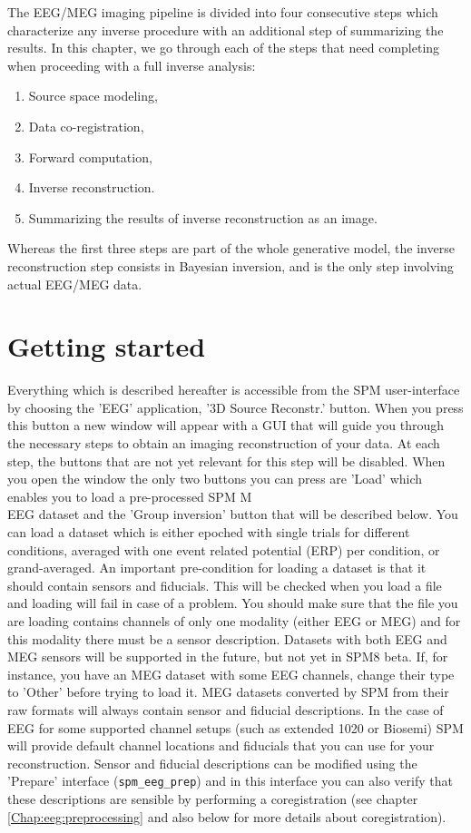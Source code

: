 The EEG/MEG imaging pipeline is divided into four consecutive steps which characterize
any inverse procedure with an additional step of summarizing the results. In this chapter, we go through each of the steps that need
completing when proceeding with a full inverse analysis:

\begin{enumerate}
    \item Source space modeling,
    \item Data co-registration,
    \item Forward computation,
    \item Inverse reconstruction.
    \item Summarizing the results of inverse reconstruction as an image.
\end{enumerate}

Whereas the first three steps are part of the whole generative model, the inverse reconstruction
step consists in Bayesian inversion, and is the only step involving actual EEG/MEG data.\\

\section{Getting started}

Everything which is described hereafter is accessible from the SPM user-interface by choosing
the 'EEG' application, '3D Source Reconstr.' button. When you press this button a new window
will appear with a GUI that will guide you through the necessary steps to obtain an imaging
reconstruction of your data. At each step, the buttons that are not yet relevant for this step
will be disabled. When you open the window the only two buttons you can press are 'Load' which enables you
to load a pre-processed SPM M\\EEG dataset and the 'Group inversion' button that will be described below.
You can load a dataset which is either epoched with single trials for different
conditions, averaged with one event related potential (ERP) per condition, or grand-averaged. An important pre-condition
for loading a dataset is that it should contain sensors and fiducials. This will be checked when you load a file
and loading will fail in case of a problem. You should make sure that the file you are loading
contains channels of only one modality (either EEG or MEG) and for this modality there must be a sensor description.
Datasets with both EEG and MEG sensors will be supported in the future, but not yet in SPM8 beta.
If, for instance, you have an MEG dataset with some EEG channels, change their type to 'Other' before trying to load it.
MEG datasets converted by SPM from their raw formats will always contain
sensor and fiducial descriptions. In the case of EEG for some supported channel setups (such as extended 1020 or Biosemi)
SPM will provide default channel locations and fiducials that you can use for your reconstruction.
Sensor and fiducial descriptions can be modified using the 'Prepare' interface (\texttt{spm\_eeg\_prep}) and in this
interface you can also verify that these descriptions are sensible by performing a coregistration (see chapter \ref{Chap:eeg:preprocessing} and also below for more details about coregistration).

